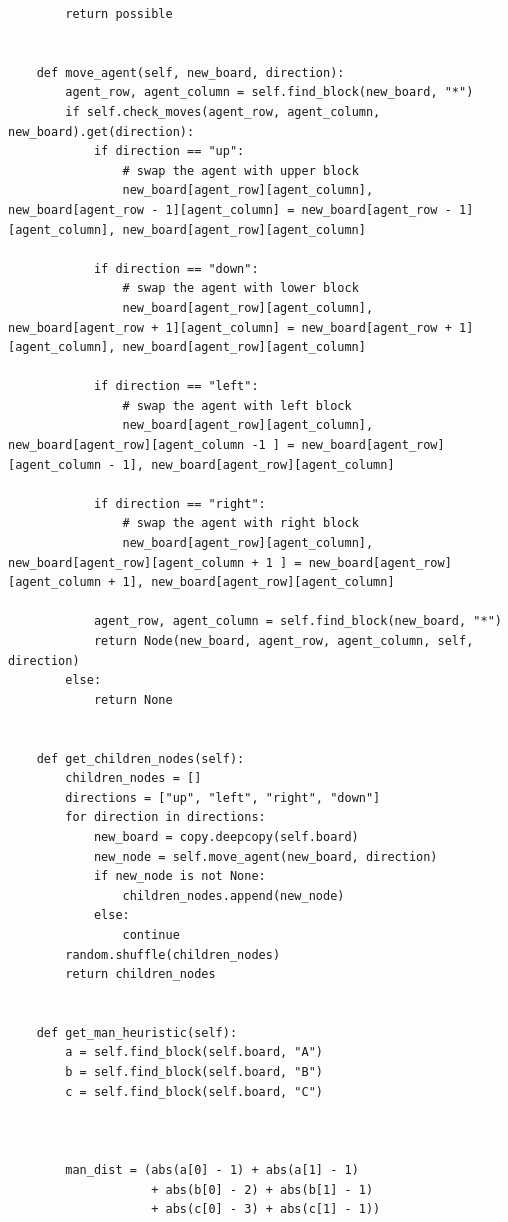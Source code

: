 \documentclass[10pt]{article}
\begin{document}
\begin{lstlisting}
        return possible


    def move_agent(self, new_board, direction):
        agent_row, agent_column = self.find_block(new_board, "*")
        if self.check_moves(agent_row, agent_column, new_board).get(direction):
            if direction == "up": 
                # swap the agent with upper block
                new_board[agent_row][agent_column], new_board[agent_row - 1][agent_column] = new_board[agent_row - 1][agent_column], new_board[agent_row][agent_column]
            
            if direction == "down": 
                # swap the agent with lower block
                new_board[agent_row][agent_column], new_board[agent_row + 1][agent_column] = new_board[agent_row + 1][agent_column], new_board[agent_row][agent_column]
        
            if direction == "left": 
                # swap the agent with left block
                new_board[agent_row][agent_column], new_board[agent_row][agent_column -1 ] = new_board[agent_row][agent_column - 1], new_board[agent_row][agent_column]

            if direction == "right": 
                # swap the agent with right block
                new_board[agent_row][agent_column], new_board[agent_row][agent_column + 1 ] = new_board[agent_row][agent_column + 1], new_board[agent_row][agent_column]
            
            agent_row, agent_column = self.find_block(new_board, "*")
            return Node(new_board, agent_row, agent_column, self, direction)
        else:
            return None
    

    def get_children_nodes(self):
        children_nodes = []
        directions = ["up", "left", "right", "down"]
        for direction in directions:
            new_board = copy.deepcopy(self.board)
            new_node = self.move_agent(new_board, direction)
            if new_node is not None:
                children_nodes.append(new_node)
            else:
                continue
        random.shuffle(children_nodes)
        return children_nodes
    

    def get_man_heuristic(self):
        a = self.find_block(self.board, "A")
        b = self.find_block(self.board, "B")
        c = self.find_block(self.board, "C")



        man_dist = (abs(a[0] - 1) + abs(a[1] - 1)
                    + abs(b[0] - 2) + abs(b[1] - 1)
                    + abs(c[0] - 3) + abs(c[1] - 1))
        

\end{lstlisting}
\end{document}
